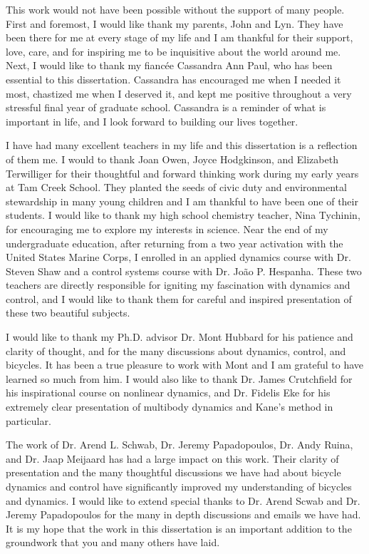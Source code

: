 \label{acknowledgements}
This work would not have been possible without the support of many people.
First and foremost, I would like thank my parents, John and Lyn. They have been
there for me at every stage of my life and I am thankful for their support,
love, care, and for inspiring me to be inquisitive about the world around me.
Next, I would like to thank my fianc\'ee Cassandra Ann Paul, who has been
essential to this dissertation. Cassandra has encouraged me when I needed it
most, chastized me when I deserved it, and kept me positive throughout a very
stressful final year of graduate school. Cassandra is a reminder of what is
important in life, and I look forward to building our lives together.

I have had many excellent teachers in my life and this dissertation is a
reflection of them me. I would to thank Joan Owen, Joyce Hodgkinson, and
Elizabeth Terwilliger for their thoughtful and forward thinking work during my
early years at Tam Creek School. They planted the seeds of civic duty and
environmental stewardship in many young children and I am thankful to have been
one of their students. I would like to thank my high school chemistry teacher,
Nina Tychinin, for encouraging me to explore my interests in science. Near the
end of my undergraduate education, after returning from a two year activation
with the United States Marine Corps, I enrolled in an applied dynamics course
with Dr. Steven Shaw and a control systems course with Dr. Jo\~{a}o P.
Hespanha. These two teachers are directly responsible for igniting my
fascination with dynamics and control, and I would like to thank them for
careful and inspired presentation of these two beautiful subjects.

I would like to thank my Ph.D. advisor Dr. Mont Hubbard for his patience and
clarity of thought, and for the many discussions about dynamics, control, and
bicycles. It has been a true pleasure to work with Mont and I am grateful to
have learned so much from him. I would also like to thank Dr. James Crutchfield
for his inspirational course on nonlinear dynamics, and Dr. Fidelis Eke for his
extremely clear presentation of multibody dynamics and Kane's method in
particular.

The work of Dr. Arend L. Schwab, Dr. Jeremy Papadopoulos, Dr. Andy Ruina, and
Dr. Jaap Meijaard has had a large impact on this work. Their clarity of
presentation and the many thoughtful discussions we have had about bicycle
dynamics and control have significantly improved my understanding of bicycles
and dynamics. I would like to extend special thanks to Dr. Arend Scwab and Dr.
Jeremy Papadopoulos for the many in depth discussions and emails we have had.
It is my hope that the work in this dissertation is an important addition to
the groundwork that you and many others have laid.

